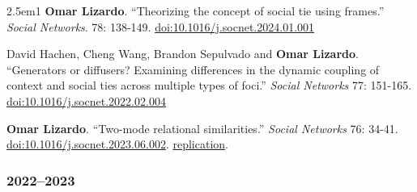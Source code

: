 \documentclass[
]{article}
\newenvironment{cventry}{\begin{hangparas}{2.5em}{1}}{\end{hangparas}}
\begin{document}
\begin{cventry}
\textbf{Omar Lizardo}. ``Theorizing the concept of social tie using
frames.'' \emph{Social Networks}. 78: 138-149.
\href{https://doi.org/10.1016/j.socnet.2024.01.001}{doi:10.1016/j.socnet.2024.01.001}

David Hachen, Cheng Wang, Brandon Sepulvado and \textbf{Omar Lizardo}.
``Generators or diffusers? Examining differences in the dynamic coupling
of context and social ties across multiple types of foci.'' \emph{Social
Networks} 77: 151-165.
\href{https://doi.org/10.1016/j.socnet.2022.02.004}{doi:10.1016/j.socnet.2022.02.004}

\textbf{Omar Lizardo}. ``Two-mode relational similarities.''
\emph{Social Networks} 76: 34-41.
\href{https://doi.org/10.1016/j.socnet.2023.06.002}{doi:10.1016/j.socnet.2023.06.002}.
\href{https://github.com/olizardo/Two-Mode-Relational-Similarity}{
replication}.

\end{cventry}

\subsubsection{2022--2023}\label{section-1}
\end{document}
